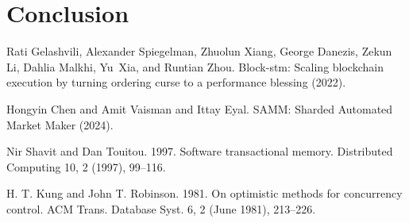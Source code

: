 \documentclass{article}
\begin{document}
\section{Conclusion}

\begin{thebibliography}{1}

     Rati Gelashvili, Alexander Spiegelman, Zhuolun Xiang, George Danezis, Zekun Li, Dahlia Malkhi,
    Yu~Xia, and Runtian Zhou. Block-stm: Scaling blockchain execution by turning ordering curse to a performance
    blessing (2022).

     Hongyin Chen and Amit Vaisman and Ittay Eyal. SAMM: Sharded Automated Market Maker (2024).

     Nir Shavit and Dan Touitou. 1997. Software transactional memory. Distributed Computing 10, 2 (1997),
    99–116.

     H. T. Kung and John T. Robinson. 1981. On optimistic methods for concurrency control. ACM Trans.
    Database Syst. 6, 2 (June 1981), 213–226.

\end{thebibliography}
\end{document}

